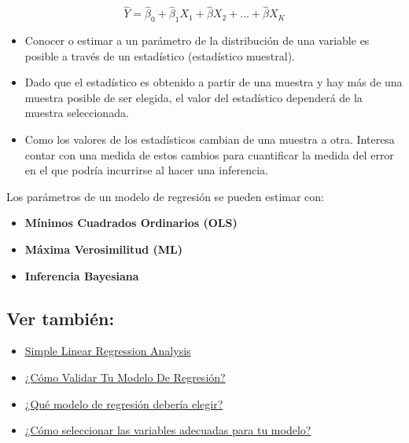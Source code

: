 \documentclass[]{book}
\providecommand{\tightlist}{%
  \setlength{\itemsep}{0pt}\setlength{\parskip}{0pt}}
\begin{document}
\[ \hat{Y}  = \hat{\beta}_0  + \hat{\beta}_1 X_1 + \hat{\beta} X_2 + ... + \hat{\beta} X_K \]

\begin{itemize}
\tightlist
\item
  Conocer o estimar a un parámetro de la distribución de una variable es posible a través de un estadístico (estadístico muestral).
\item
  Dado que el estadístico es obtenido a partir de una muestra y hay más de una muestra posible de ser elegida, el valor del estadístico dependerá de la muestra seleccionada.
\item
  Como los valores de los estadísticos cambian de una muestra a otra. Interesa contar con una medida de estos cambios para cuantificar la medida del error en el que podría incurrirse al hacer una inferencia.
\end{itemize}

Los parámetros de un modelo de regresión se pueden estimar con:

\begin{itemize}
\tightlist
\item
  \textbf{Mínimos Cuadrados Ordinarios (OLS)}
\item
  \textbf{Máxima Verosimilitud (ML)}
\item
  \textbf{Inferencia Bayesiana}
\end{itemize}

\hypertarget{ver-tambien}{%
\subsection{Ver también:}\label{ver-tambien}}

\begin{itemize}
\item
  \href{http://reliawiki.org/index.php/Simple_Linear_Regression_Analysis}{Simple Linear Regression Analysis}
\item
  \href{https://www.maximaformacion.es/master-estadistica-aplicada-con-r/blog/item/como-validar-tu-modelo-de-regresion.html}{¿Cómo Validar Tu Modelo De Regresión?}
\item
  \href{https://www.maximaformacion.es/master-estadistica-aplicada-con-r/blog/item/que-modelo-de-regresion-deberia-elegir.html}{¿Qué modelo de regresión debería elegir?}
\item
  \href{https://www.maximaformacion.es/master-estadistica-aplicada-con-r/blog/item/como-seleccionar-las-variables-adecuadas-para-tu-modelo.html}{¿Cómo seleccionar las variables adecuadas para tu modelo?}
\end{itemize}
\end{document}
